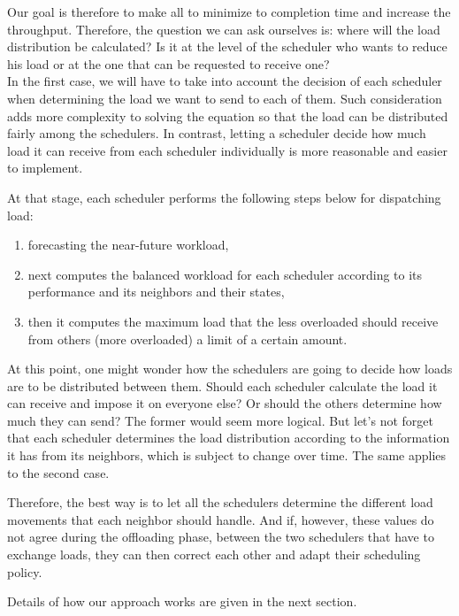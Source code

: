 Our goal is therefore to make all to minimize to completion time and increase the throughput. Therefore, the question we can ask ourselves is: where will the load distribution be calculated? Is it at the level of the scheduler who wants to reduce his load or at the one that can be requested to receive one?\\
In the first case, we will have to take into account the decision of each scheduler when determining the load we want to send to each of them. Such consideration adds more complexity to solving the equation so that the load can be distributed fairly among the schedulers. In contrast, letting a scheduler decide how much load it can receive from each scheduler individually is more reasonable and easier to implement.

At that stage, each scheduler performs the following steps below for dispatching load:
\begin{enumerate}
    \item forecasting the near-future workload,
    \item next computes the balanced workload for each scheduler according to its performance and its neighbors and their states,
    \item then it computes the maximum load that the less overloaded should receive from others (more overloaded) a limit of a certain amount.
\end{enumerate}

At this point, one might wonder how the schedulers are going to decide how loads are to be distributed between them. Should each scheduler calculate the load it can receive and impose it on everyone else? Or should the others determine how much they can send?
The former would seem more logical. But let's not forget that each scheduler determines the load distribution according to the information it has from its neighbors, which is subject to change over time. The same applies to the second case.

Therefore, the best way is to let all the schedulers determine the different load movements that each neighbor should handle. And if, however, these values do not agree during the offloading phase, between the two schedulers that have to exchange loads, they can then correct each other and adapt their scheduling policy.

Details of how our approach works are given in the next section.